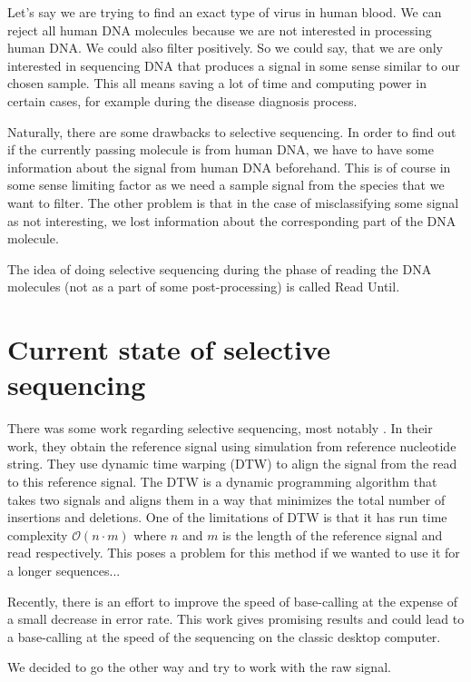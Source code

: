 Let's say we are trying to find an exact type of virus in human blood. We can
reject all human DNA molecules because we are not interested in processing human
DNA. We could also filter positively. So we could say, that we are only
interested in sequencing DNA that produces a signal in some sense similar to our
chosen sample. This all means saving a lot of time and computing power in certain
cases, for example during the disease diagnosis process.

Naturally, there are some drawbacks to selective sequencing. In order to find out
if the currently passing molecule is from human DNA, we have to have some information
about the signal from human DNA beforehand.
This is of course in some sense limiting factor as we need a sample signal from
the species that we want to filter. The other problem is that in the case of misclassifying
some signal as not interesting, we lost information about the corresponding
part of the DNA molecule.

The idea of doing selective sequencing during the phase of reading the DNA molecules
(not as a part of some post-processing) is called Read Until. 

\section{Current state of selective sequencing}


There was some work regarding selective sequencing, most notably \cite{loose2016real}. In their
work, they obtain the reference signal using simulation from reference nucleotide
string. They use dynamic time warping (DTW) to align the signal from the read to
this reference signal. The DTW is a dynamic programming algorithm that takes two signals and aligns them in a
way that minimizes the total number of insertions and deletions. One of the limitations
of DTW is that it has run time complexity $\mathcal{O}(n\cdot m)$ where $n$ and $m$
is the length of the reference signal and read respectively. This poses a problem
for this method if we wanted to use it for a longer sequences...

Recently, there is an effort to improve the speed of base-calling at the expense
of a small decrease in error rate. This work gives promising results and could lead
to a base-calling at the speed of the sequencing on the classic desktop computer.

We decided to go the other way and try to work with the raw signal.
